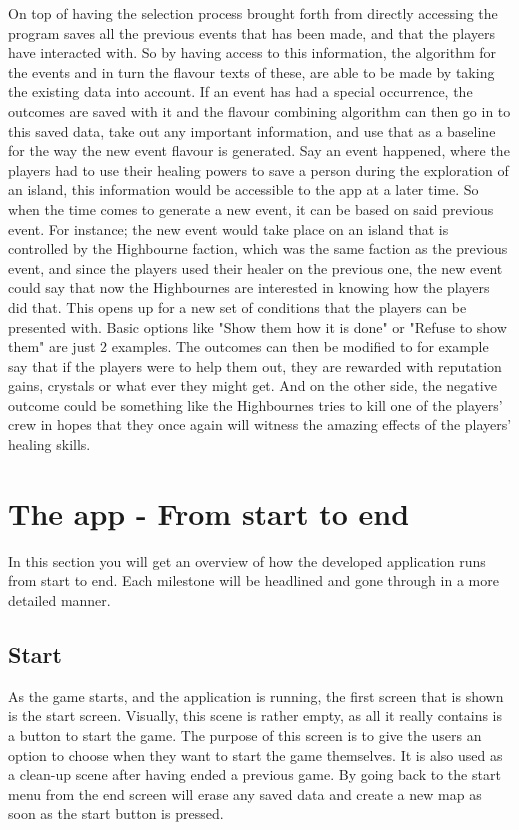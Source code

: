 On top of having the selection process brought forth from directly accessing the program saves all the previous events that has been made, and that the players have interacted with. So by having access to this information, the algorithm for the events and in turn the flavour texts of these, are able to be made by taking the existing data into account. If an event has had a special occurrence, the outcomes are saved with it and the flavour combining algorithm can then go in to this saved data, take out any important information, and use that as a baseline for the way the new event flavour is generated. Say an event happened, where the players had to use their healing powers to save a person during the exploration of an island, this information would be accessible to the app at a later time. So when the time comes to generate a new event, it can be based on said previous event. For instance; the new event would take place on an island that is controlled by the Highbourne faction, which was the same faction as the previous event, and since the players used their healer on the previous one, the new event could say that now the Highbournes are interested in knowing how the players did that. This opens up for a new set of conditions that the players can be presented with. Basic options like "Show them how it is done" or "Refuse to show them" are just 2 examples. The outcomes can then be modified to for example say that if the players were to help them out, they are rewarded with reputation gains, crystals or what ever they might get. And on the other side, the negative outcome could be something like the Highbournes tries to kill one of the players' crew in hopes that they once again will witness the amazing effects of the players' healing skills.


\section{The app - From start to end}
In this section you will get an overview of how the developed application runs from start to end. Each milestone will be headlined and gone through in a more detailed manner.

\subsection{Start}
As the game starts, and the application is running, the first screen that is shown is the start screen. Visually, this scene is rather empty, as all it really contains is a button to start the game. The purpose of this screen is to give the users an option to choose when they want to start the game themselves. It is also used as a clean-up scene after having ended a previous game. By going back to the start menu from the end screen will erase any saved data and create a new map as soon as the start button is pressed.

